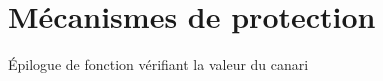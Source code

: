 \chapter{Mécanismes de protection}
\label{chap:mecanismeProtection}

\begin{listing}
	\caption{Épilogue de fonction vérifiant la valeur du canari}
	\label{lst:stackCookiesASM}
\end{listing}
